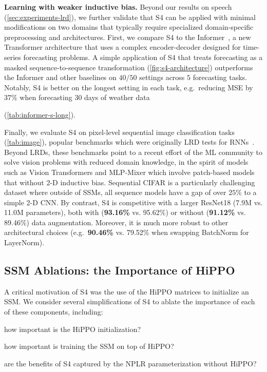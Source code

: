 \textbf{Learning with weaker inductive bias.} Beyond our results on speech (\ref{sec:experiments-lrd}), we further validate that S4 can be applied with minimal modifications on two domains that typically require specialized domain-specific preprocessing and architectures. First, we compare S4 to the Informer~\citep{haoyietal-informer-2021}, a new Transformer architecture that uses a complex encoder-decoder designed for time-series forecasting problems. A simple application of S4 that treats forecasting as a masked sequence-to-sequence transformation (\ref{fig:s4-architecture})
outperforms the Informer and other baselines on $40/50$ settings across $5$ forecasting tasks. Notably, S4 is better on the longest setting in each task, e.g.\ reducing MSE by $37\%$ when forecasting $30$ days of weather data

(\ref{tab:informer-s-long}).

Finally, we evaluate S4 on pixel-level sequential image classification tasks (\ref{tab:image}),
popular benchmarks which were originally LRD tests for RNNs~\citep{arjovsky2016unitary}. Beyond LRDs, these benchmarks point to a recent effort of the ML community to solve vision problems with reduced domain knowledge, in the spirit of models such as Vision Transformers \citep{dosovitskiy2020image} and MLP-Mixer \citep{tolstikhin2021mlp} which involve patch-based models that without 2-D inductive bias. Sequential CIFAR is a particularly challenging dataset where outside of SSMs, all sequence models have a gap of over $25\%$ to a simple 2-D CNN. By contrast, S4 is competitive with a larger ResNet18 (7.9M vs. 11.0M parameters), both with (\textbf{93.16\%} vs. 95.62\%) or without (\textbf{91.12\%} vs. 89.46\%) data augmentation. Moreover, it is much more robust to other architectural choices (e.g.\ \textbf{90.46\%} vs. 79.52\% when swapping BatchNorm for LayerNorm).

\subsection{SSM Ablations: the Importance of HiPPO} A critical motivation of S4 was the use of the HiPPO matrices to initialize an SSM. We consider several simplifications of S4 to ablate the importance of each of these components, including:

\begin{enumerate*}[label=(\roman*)]
  \item how important is the HiPPO initialization?
  \item how important is training the SSM on top of HiPPO?
  \item are the benefits of S4 captured by the NPLR parameterization without HiPPO?
\end{enumerate*}

